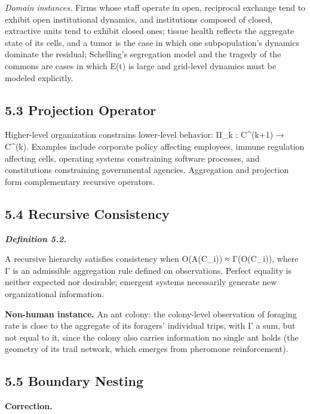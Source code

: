 \documentclass[
]{article}
\begin{document}
\emph{Domain instances.} Firms whose staff operate in open, reciprocal
exchange tend to exhibit open institutional dynamics, and institutions
composed of closed, extractive units tend to exhibit closed ones; tissue
health reflects the aggregate state of its cells, and a tumor is the
case in which one subpopulation's dynamics dominate the residual;
Schelling's segregation model and the tragedy of the commons are cases
in which E(t) is large and grid-level dynamics must be modeled
explicitly.

\hypertarget{projection-operator}{%
\subsection{5.3 Projection Operator}\label{projection-operator}}

Higher-level organization constrains lower-level behavior: Π\_k :
C\^{}(k+1) → C\^{}(k). Examples include corporate policy affecting
employees, immune regulation affecting cells, operating systems
constraining software processes, and constitutions constraining
governmental agencies. Aggregation and projection form complementary
recursive operators.

\hypertarget{recursive-consistency}{%
\subsection{5.4 Recursive Consistency}\label{recursive-consistency}}

\emph{\textbf{Definition 5.2.}}

A recursive hierarchy satisfies consistency when O(A(C\_i)) ≈
Γ(O(C\_i)), where Γ is an admissible aggregation rule defined on
observations. Perfect equality is neither expected nor desirable;
emergent systems necessarily generate new organizational information.

\textbf{Non-human instance.} An ant colony: the colony-level observation
of foraging rate is close to the aggregate of its foragers' individual
trips, with Γ a sum, but not equal to it, since the colony also carries
information no single ant holds (the geometry of its trail network,
which emerges from pheromone reinforcement).

\hypertarget{boundary-nesting}{%
\subsection{5.5 Boundary Nesting}\label{boundary-nesting}}

\textbf{Correction.}
\end{document}
